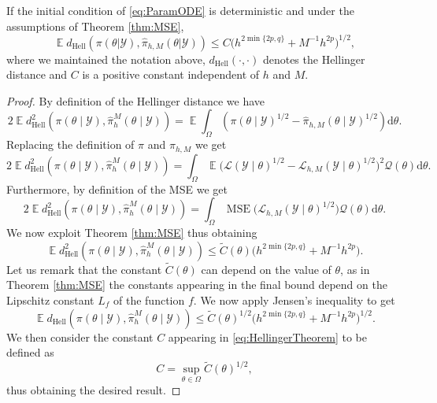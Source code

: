 \documentclass{siamart1116}
\numberwithin{theorem}{section}
\newcommand{\diffL}{\mathcal{L}}
\newcommand{\prior}{\mathcal{Q}}
\newcommand{\E}{\operatorname{\mathbb{E}}}
\newcommand{\MSE}{\operatorname{MSE}}
\newcommand{\Hell}{d_{\mathrm{Hell}}}
\newcommand{\dd}{\mathrm{d}}
\begin{document}
\begin{theorem}\label{thm:HellingerTheorem} If the initial condition of \eqref{eq:ParamODE} is deterministic and under the assumptions of Theorem \ref{thm:MSE},
	\begin{equation}\label{eq:HellingerTheorem}
		\E \Hell(\pi(\theta|\mathcal{Y}), \hat \pi_{h,M}(\theta|\mathcal{Y})) \leq C \big(h^{2\min\{2p, q\}} + M^{-1}h^{2p}\big)^{1/2}, 
	\end{equation}
	where we maintained the notation above, $\Hell(\cdot, \cdot)$ denotes the Hellinger distance and $C$ is a positive constant independent of $h$ and $M$.
\end{theorem}
\begin{proof} By definition of the Hellinger distance we have
	\begin{equation}
		2\E\Hell^2(\pi(\theta\mid\mathcal{Y}),\hat\pi^M_h(\theta\mid\mathcal{Y})) = \E\int_\Omega (\pi(\theta\mid\mathcal{Y})^{1/2} - \hat\pi_{h, M}(\theta\mid\mathcal{Y})^{1/2}) \dd \theta.
	\end{equation}
	Replacing the definition of $\pi$ and $\pi_{h, M}$ we get
	\begin{equation}
		2\E\Hell^2(\pi(\theta\mid\mathcal{Y}),\hat\pi^M_h(\theta\mid\mathcal{Y})) = \int_\Omega \E \big(\diffL(\mathcal{Y}\mid\theta)^{1/2} - \diffL_{h,M}(\mathcal Y\mid\theta)^{1/2}\big)^2 \prior(\theta)\dd \theta.
	\end{equation}
	Furthermore, by definition of the MSE we get
	\begin{equation}
		2\E\Hell^2(\pi(\theta\mid\mathcal{Y}),\hat\pi^M_h(\theta\mid\mathcal{Y})) = \int_\Omega \MSE\big(\diffL_{h,M}(\mathcal Y\mid\theta)^{1/2}\big) \prior(\theta)\dd \theta.
	\end{equation}
	We now exploit Theorem \ref{thm:MSE} thus obtaining
	\begin{equation}
		\E\Hell^2(\pi(\theta\mid\mathcal{Y}),\hat\pi^M_h(\theta\mid\mathcal{Y})) \leq \tilde C(\theta) \big(h^{2\min\{2p, q\}} + M^{-1}h^{2p}\big).
	\end{equation}
	Let us remark that the constant $\tilde C(\theta)$ can depend on the value of $\theta$, as in Theorem \ref{thm:MSE} the constants appearing in the final bound depend on the Lipschitz constant $L_f$ of the function $f$. We now apply Jensen's inequality to get 
	\begin{equation}
		\E\Hell(\pi(\theta\mid\mathcal{Y}),\hat\pi^M_h(\theta\mid\mathcal{Y})) \leq \tilde C(\theta)^{1/2} \big(h^{2\min\{2p, q\}} + M^{-1}h^{2p}\big)^{1/2}.
	\end{equation}
	We then consider the constant $C$ appearing in \eqref{eq:HellingerTheorem} to be defined as
	\begin{equation}
		C = \sup_{\theta \in \Omega} \tilde C(\theta)^{1/2},
	\end{equation}
	thus obtaining the desired result.
\end{proof}
\end{document}
